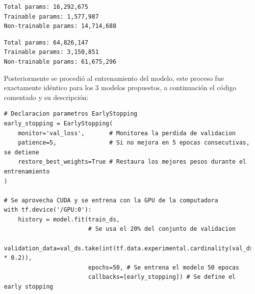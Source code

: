 \begin{lstlisting}[caption={Salida del método summary aplicado a la red de \textit{Transfer Learning} con \textit{VGG16}}]
Total params: 16,292,675
Trainable params: 1,577,987
Non-trainable params: 14,714,688
\end{lstlisting}

\begin{lstlisting}[caption={Salida del método summary aplicado a la red de \textit{Transfer Learning} con \textit{ResNetRS101}}]
Total params: 64,826,147
Trainable params: 3,150,851
Non-trainable params: 61,675,296
\end{lstlisting}

Posteriormente se procedió al entrenamiento del modelo, este proceso fue exactamente idéntico para los 3 modelos propuestos, a continuación el código comentado y su descripción: \\


\begin{lstlisting}[caption={Código entrenamiento de la CNN con \textit{Transfer Learning} sin importar el modelo base}]
# Declaracion parametros EarlyStopping
early_stopping = EarlyStopping(
    monitor='val_loss',       # Monitorea la perdida de validacion
    patience=5,               # Si no mejora en 5 epocas consecutivas, se detiene
    restore_best_weights=True # Restaura los mejores pesos durante el entrenamiento
)

# Se aprovecha CUDA y se entrena con la GPU de la computadora
with tf.device('/GPU:0'):
    history = model.fit(train_ds, 
                        # Se usa el 20% del conjunto de validacion
                        validation_data=val_ds.take(int(tf.data.experimental.cardinality(val_ds).numpy() * 0.2)), 
                        epochs=50, # Se entrena el modelo 50 epocas
                        callbacks=[early_stopping]) # Se define el early stopping
\end{lstlisting}

